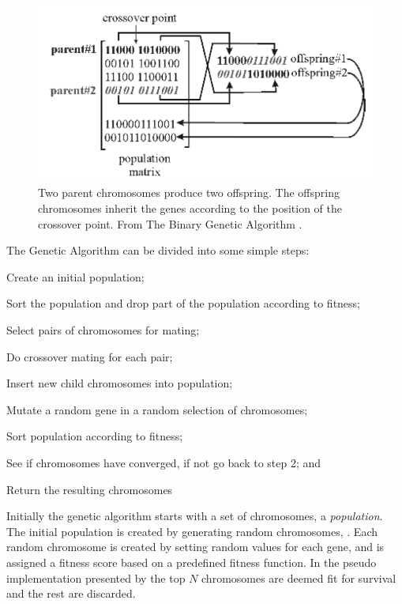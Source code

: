 \begin{figure}[!h]
  \begin{center}
    \includegraphics[totalheight=0.175\textheight]{figures/crossover}
  \end{center}
  \caption{Two parent chromosomes produce two offspring. The offspring chromosomes inherit the genes according to the position of the crossover point. From The Binary Genetic Algorithm \protect \cite[p. 42]{Haupt2004a}.}
  \label{fig:crossover}
\end{figure}

The Genetic Algorithm can be divided into some simple steps:
\begin{inparaenum}[\itshape 1\upshape)]
\item Create an initial population;
\item Sort the population and drop part of the population according to fitness;
\item Select pairs of chromosomes for mating;
\item Do crossover mating for each pair;
\item Insert new child chromosomes into population;
\item Mutate a random gene in a random selection of chromosomes;
\item Sort population according to fitness;
\item See if chromosomes have converged, if not go back to step 2; and
\item Return the resulting chromosomes
\end{inparaenum}

Initially the genetic algorithm starts with a set of chromosomes, a \textit{population}. The initial population is created by generating random chromosomes, \parencite{Haupt2004a,Negnevitsky2002,Goldberg1989}. Each random chromosome is created by setting random values for each gene, and is assigned a fitness score based on a predefined fitness function. In the pseudo implementation presented by \citeauthor{Haupt2004a} the top \(N\) chromosomes are deemed fit for survival and the rest are discarded.

